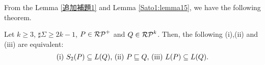 From the Lemma \ref{追加補題1} 
and Lemma \ref{Sato1:lemma15},%
we have the following theorem.


\begin{thm}\label{定理17}
    Let $k \geq 3$, $\sharp\Sigma \geq 2k-1$, $P \in \mathcal{RP}^{+}$ and
    $Q \in \mathcal{RP}^{k}$.
    Then, the following (i),(ii) and (iii) are equivalent:
    \[
        \begin{tabular}{ll}
            $(\mathrm{i})$ $S_{2}(P) \subseteq L(Q)$,
            $(\mathrm{ii})$ $P \sqsubseteq Q$,
            $(\mathrm{iii})$ $L(P) \subseteq L(Q)$.
        \end{tabular}
    \]
\end{thm}


